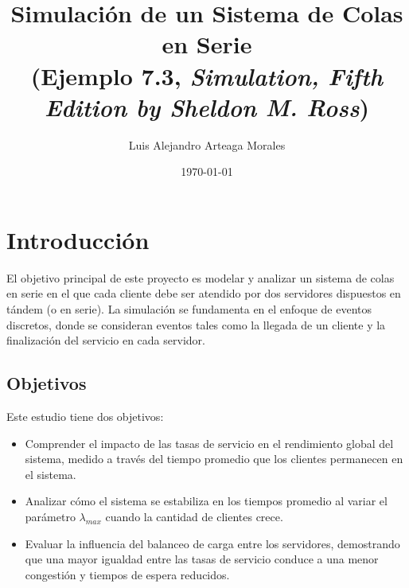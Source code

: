 \documentclass[12pt]{article}
\title{Simulación de un Sistema de Colas en Serie \\ (Ejemplo 7.3, \textit{Simulation, Fifth Edition by Sheldon M. Ross})}
\author{Luis Alejandro Arteaga Morales}
\date{\today}
\begin{document}
\maketitle

\section{Introducción}
El objetivo principal de este proyecto es modelar y analizar un sistema de colas en serie en el que cada cliente debe ser atendido por dos servidores dispuestos en tándem (o en serie). La simulación se fundamenta en el enfoque de eventos discretos, donde se consideran eventos tales como la llegada de un cliente y la finalización del servicio en cada servidor.

\subsection{Objetivos}
Este estudio tiene dos objetivos:
\begin{itemize}
    \item Comprender el impacto de las tasas de servicio en el rendimiento global del sistema, medido a través del tiempo promedio que los clientes permanecen en el sistema.
    \item Analizar cómo el sistema se estabiliza en los tiempos promedio al variar el parámetro $\lambda_{max}$ cuando la cantidad de clientes crece.
    \item Evaluar la influencia del balanceo de carga entre los servidores, demostrando que una mayor igualdad entre las tasas de servicio conduce a una menor congestión y tiempos de espera reducidos.
\end{itemize}
\end{document}
